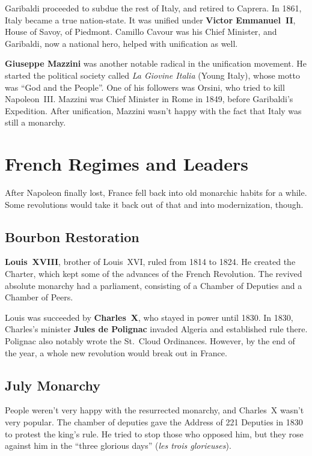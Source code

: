 Garibaldi proceeded to subdue the rest of Italy, and retired to Caprera.
In 1861, Italy became a true nation-state.
It was unified under \textbf{Victor Emmanuel~II}, House of Savoy, of Piedmont.
Camillo Cavour was his Chief Minister,
and Garibaldi, now a national hero, helped with unification as well.

\textbf{Giuseppe Mazzini} was another notable radical in the unification movement.
He started the political society called \textit{La Giovine Italia} (Young Italy),
whose motto was ``God and the People''.
One of his followers was Orsini, who tried to kill Napoleon~III\@.
Mazzini was Chief Minister in Rome in 1849, before Garibaldi's Expedition.
After unification, Mazzini wasn't happy with the fact that Italy was still a monarchy.

\section{French Regimes and Leaders}

After Napoleon finally lost, France fell back into old monarchic habits for a while.
Some revolutions would take it back out of that and into modernization, though.

\subsection*{Bourbon Restoration}

\textbf{Louis~XVIII}, brother of Louis~XVI, ruled from 1814 to 1824.
He created the Charter, which kept some of the advances of the French Revolution.
The revived absolute monarchy had a parliament, consisting of a Chamber of Deputies and a Chamber of Peers.

Louis was succeeded by \textbf{Charles~X}, who stayed in power until 1830.
In 1830, Charles's minister \textbf{Jules de Polignac} invaded Algeria and established rule there.
Polignac also notably wrote the St.\ Cloud Ordinances.
However, by the end of the year, a whole new revolution would break out in France.

\subsection*{July Monarchy}

People weren't very happy with the resurrected monarchy, and Charles~X wasn't very popular.
The chamber of deputies gave the Address of 221 Deputies in 1830 to protest the king's rule.
He tried to stop those who opposed him,
but they rose against him in the ``three glorious days'' (\textit{les trois glorieuses}).

